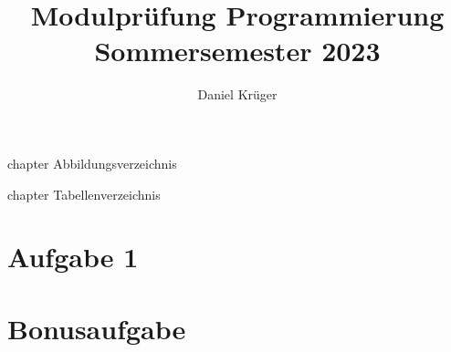 \documentclass{scrreprt}
\title{Modulprüfung Programmierung Sommersemester 2023}
\author{Daniel Krüger}
\date{}
\begin{document}
\nocite{*}

\maketitle

\tableofcontents

\listoffigures
{} {chapter} {Abbildungsverzeichnis}

\listoftables
{} {chapter} {Tabellenverzeichnis}

\chapter{Aufgabe 1}


\chapter{Bonusaufgabe}



\end{document}
